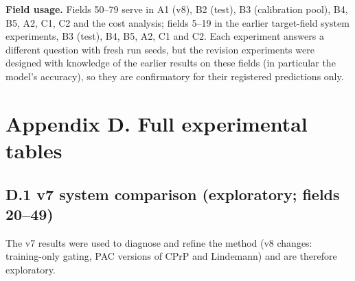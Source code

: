\documentclass[preprint,12pt,authoryear]{elsarticle}
\begin{document}
\textbf{Field usage.} Fields 50--79 serve in A1 (v8), B2 (test), B3 (calibration pool), B4, B5, A2, C1, C2 and the cost analysis; fields 5--19 in the earlier target-field system experiments, B3 (test), B4, B5, A2, C1 and C2. Each experiment answers a different question with fresh run seeds, but the revision experiments were designed with knowledge of the earlier results on these fields (in particular the model's accuracy), so they are confirmatory for their registered predictions only.

\section*{Appendix D. Full experimental tables}

\subsection*{D.1 v7 system comparison (exploratory; fields 20--49)}

The v7 results were used to diagnose and refine the method (v8 changes: training-only gating, PAC versions of CPrP and Lindemann) and are therefore exploratory.
\end{document}
